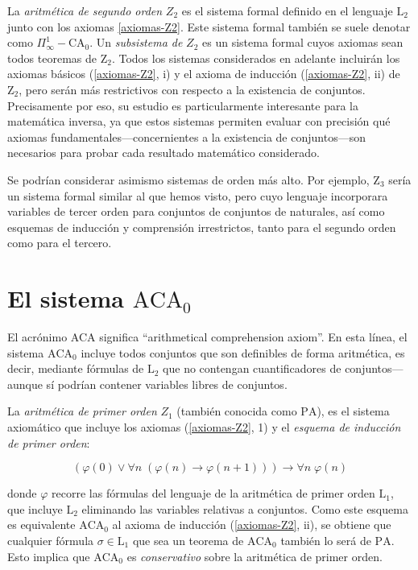 \documentclass[11pt,a4paper]{book}
\theoremstyle{plain}
\theoremstyle{definition}
\theoremstyle{remark}
\begin{document}
La \textit{aritmética de segundo orden} $Z_2$ es el sistema formal definido en el lenguaje $\mathrm{L}_2$ junto con los axiomas \ref{axiomas-Z2}. Este sistema formal también se suele denotar como $\Pi ^1_{\infty}-\mathrm{CA}_0$. Un \textit{subsistema de} $Z_2$ es un sistema formal cuyos axiomas sean todos teoremas de $\mathrm{Z}_2$. Todos los sistemas considerados en adelante incluirán los axiomas básicos (\ref{axiomas-Z2}, i) y el axioma de inducción (\ref{axiomas-Z2}, ii) de $\mathrm{Z}_2$, pero serán más restrictivos con respecto a la existencia de conjuntos. Precisamente por eso, su estudio es particularmente interesante para la matemática inversa, ya que estos sistemas permiten evaluar con precisión qué axiomas fundamentales—concernientes a la existencia de conjuntos—son necesarios para probar cada resultado matemático considerado.

Se podrían considerar asimismo sistemas de orden más alto. Por ejemplo, $\mathrm{Z}_3$ sería un sistema formal similar al que hemos visto, pero cuyo lenguaje incorporara variables de tercer orden para conjuntos de conjuntos de naturales, así como esquemas de inducción y comprensión irrestrictos, tanto para el segundo orden como para el tercero.

\section{El sistema \texorpdfstring{$\mathrm{ACA}_0$}{ACA₀}}

El acrónimo ACA significa “arithmetical comprehension axiom”. En esta línea, el sistema $\mathrm{ACA}_0$ incluye todos conjuntos que son definibles de forma aritmética, es decir, mediante fórmulas de $\mathrm{L}_2$ que no contengan cuantificadores de conjuntos—aunque sí podrían contener variables libres de conjuntos. 

La \textit{aritmética de primer orden} $Z_1$ (también conocida como $\mathrm{PA}$), es el sistema axiomático que incluye los axiomas (\ref{axiomas-Z2}, 1) y el \textit{esquema de inducción de primer orden}: 

$$ (\varphi(0) \vee \forall n \; (\varphi(n) \rightarrow \varphi(n + 1))) \rightarrow \forall n \; \varphi(n) $$

donde $\varphi$ recorre las fórmulas del lenguaje de la aritmética de primer orden $\mathrm{L}_1$, que incluye $\mathrm{L}_2$ eliminando las variables relativas a conjuntos. Como este esquema es equivalente $\mathrm{ACA}_0$ al axioma de inducción (\ref{axiomas-Z2}, ii), se obtiene que cualquier fórmula $\sigma \in \mathrm{L}_1$ que sea un teorema de $\mathrm{ACA}_0$ también lo será de $\mathrm{PA}$. Esto implica que $\mathrm{ACA}_0$ es \textit{conservativo} sobre la aritmética de primer orden.
\end{document}
